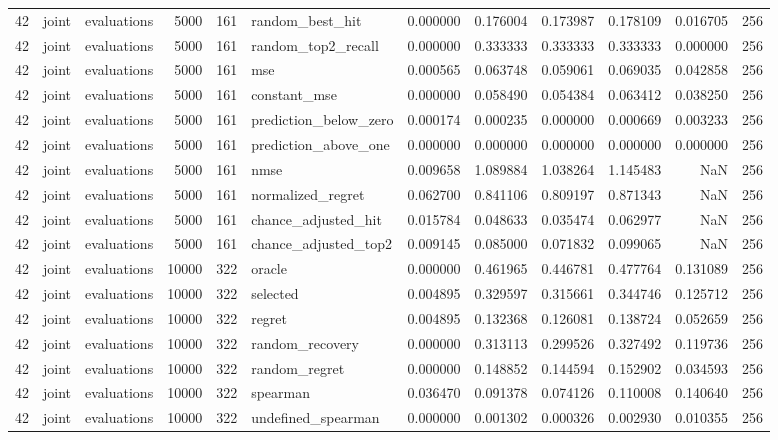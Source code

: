 \begin{tabular}{rllrrlrrrrrr}
42 & joint & evaluations & 5000 & 161 & random_best_hit & 0.000000 & 0.176004 & 0.173987 & 0.178109 & 0.016705 & 256 \\
42 & joint & evaluations & 5000 & 161 & random_top2_recall & 0.000000 & 0.333333 & 0.333333 & 0.333333 & 0.000000 & 256 \\
42 & joint & evaluations & 5000 & 161 & mse & 0.000565 & 0.063748 & 0.059061 & 0.069035 & 0.042858 & 256 \\
42 & joint & evaluations & 5000 & 161 & constant_mse & 0.000000 & 0.058490 & 0.054384 & 0.063412 & 0.038250 & 256 \\
42 & joint & evaluations & 5000 & 161 & prediction_below_zero & 0.000174 & 0.000235 & 0.000000 & 0.000669 & 0.003233 & 256 \\
42 & joint & evaluations & 5000 & 161 & prediction_above_one & 0.000000 & 0.000000 & 0.000000 & 0.000000 & 0.000000 & 256 \\
42 & joint & evaluations & 5000 & 161 & nmse & 0.009658 & 1.089884 & 1.038264 & 1.145483 & NaN & 256 \\
42 & joint & evaluations & 5000 & 161 & normalized_regret & 0.062700 & 0.841106 & 0.809197 & 0.871343 & NaN & 256 \\
42 & joint & evaluations & 5000 & 161 & chance_adjusted_hit & 0.015784 & 0.048633 & 0.035474 & 0.062977 & NaN & 256 \\
42 & joint & evaluations & 5000 & 161 & chance_adjusted_top2 & 0.009145 & 0.085000 & 0.071832 & 0.099065 & NaN & 256 \\
42 & joint & evaluations & 10000 & 322 & oracle & 0.000000 & 0.461965 & 0.446781 & 0.477764 & 0.131089 & 256 \\
42 & joint & evaluations & 10000 & 322 & selected & 0.004895 & 0.329597 & 0.315661 & 0.344746 & 0.125712 & 256 \\
42 & joint & evaluations & 10000 & 322 & regret & 0.004895 & 0.132368 & 0.126081 & 0.138724 & 0.052659 & 256 \\
42 & joint & evaluations & 10000 & 322 & random_recovery & 0.000000 & 0.313113 & 0.299526 & 0.327492 & 0.119736 & 256 \\
42 & joint & evaluations & 10000 & 322 & random_regret & 0.000000 & 0.148852 & 0.144594 & 0.152902 & 0.034593 & 256 \\
42 & joint & evaluations & 10000 & 322 & spearman & 0.036470 & 0.091378 & 0.074126 & 0.110008 & 0.140640 & 256 \\
42 & joint & evaluations & 10000 & 322 & undefined_spearman & 0.000000 & 0.001302 & 0.000326 & 0.002930 & 0.010355 & 256 \\

\end{tabular}
